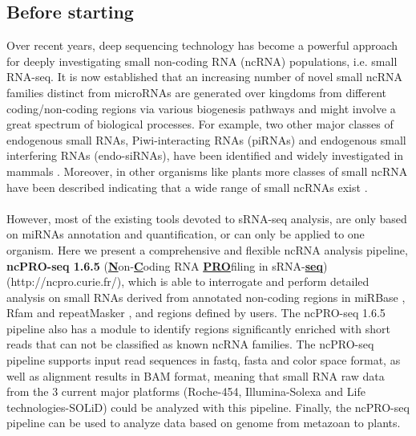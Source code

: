 \documentclass[12pt]{article}
\def \ncpip{ncPRO-seq 1.6.5}
\begin{document}
\subsection{Before starting}
\label{subsection:beforestarting}
Over recent years, deep sequencing technology has become a powerful approach for deeply investigating small non-coding RNA (ncRNA) populations, i.e. small RNA-seq. It is now established that an increasing number of novel small ncRNA families distinct from microRNAs are generated over kingdoms from different coding/non-coding regions via various biogenesis pathways and might involve a great spectrum of biological processes. For example, two other major classes of endogenous small RNAs, Piwi-interacting RNAs (piRNAs) and endogenous small interfering RNAs (endo-siRNAs), have been identified and widely investigated in mammals \cite{Ghildiyal2009}. Moreover, in other organisms like plants more classes of small ncRNA have been described indicating that a wide range of small ncRNAs exist \cite{Brodersen2006}.\\\\
However, most of the existing tools devoted to sRNA-seq analysis, are only based on miRNAs annotation and quantification, or can only be applied to one organism. Here we present a comprehensive and flexible ncRNA analysis pipeline, \textbf{\ncpip{}} (\textbf{\underline{N}}on-\textbf{\underline{C}}oding RNA \textbf{\underline{PRO}}filing in sRNA-\textbf{\underline{seq}}) (http://ncpro.curie.fr/), which is able to interrogate and perform detailed analysis on small RNAs derived from annotated non-coding regions in miRBase \cite{Kozomara2011}, Rfam \cite{Gardner2011} and repeatMasker \cite{Smit2008}, and regions defined by users. The \ncpip{} pipeline also has a module to identify regions significantly enriched with short reads that can not be classified as known ncRNA families. The ncPRO-seq pipeline supports input read sequences in fastq, fasta and color space format, as well as alignment results in BAM format, meaning that small RNA raw data from the 3 current major platforms (Roche-454, Illumina-Solexa and Life technologies-SOLiD) could be analyzed with this pipeline. Finally, the ncPRO-seq pipeline can be used to analyze data based on genome from metazoan to plants.
\end{document}
